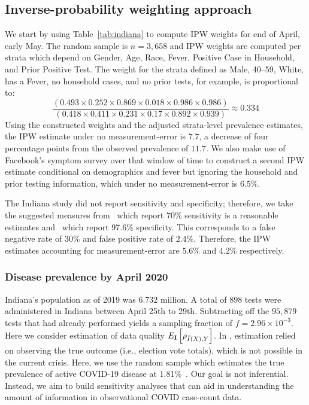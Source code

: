 \documentclass[11pt]{amsart}
\numberwithin{equation}{section}
\theoremstyle{plain}
\def\I{\bf I}
\begin{document}
\subsection{Inverse-probability weighting approach}



We start by using Table~\ref{tab:indiana} to compute IPW weights for end of April, early May.  The random sample is $n=3,658$ and IPW weights are computed per strata which depend on Gender, Age, Race, Fever, Positive Case in Household, and Prior Positive Test.  The weight for the strata defined as Male, 40--59, White, has a Fever, no household cases, and no prior tests, for example, is proportional to:
$$
\frac{\left( 0.493 \times 0.252 \times 0.869 \times 0.018 \times 0.986 \times 0.986 \right)}{\left(0.418 \times 0.411 \times 0.231 \times 0.17 \times 0.892 \times 0.939 \right)} \approx 0.334
$$
Using the constructed weights and the adjusted strata-level prevalence estimates, the IPW estimate under no measurement-error is $7.7$, a decrease of four percentage points from the observed prevalence of $11.7$. We also make use of Facebook's symptom survey over that window of time to construct a second IPW estimate conditional on demographics and fever but ignoring the household and prior testing information, which under no measurement-error is $6.5$\%.

The Indiana study did not report sensitivity and specificity; therefore, we take the suggested measures from~\cite{Woloshin2020} which report 70\% sensitivity is a reasonable estimates and~\cite{Cohen2020} which report 97.6\% specificity.  This corresponds to a false negative rate of $30\%$ and false positive rate of $2.4\%$.  Therefore, the IPW estimates accounting for measurement-error are $5.6\%$ and $4.2\%$ respectively.

\subsubsection{Disease prevalence by April 2020}

Indiana's population as of 2019 was $6.732$ million.  A total of $898$ tests were administered in Indiana between April 25th to 29th. Subtracting off the $95,879$ tests that had already performed yields a sampling fraction of $f = 2.96 \times 10^{-3}$.  Here we consider estimation of data quality $E_{\I} \left[ \rho_{\tilde I(X),Y} \right]$. In \cite{Meng2018}, estimation relied on observing the true outcome (i.e., election vote totals), which is not possible in the current crisis.  Here, we use the random sample which estimates the true prevalence of active COVID-19 disease at 1.81\%~\cite{Yiannoutsos2021}.  Our goal is not inferential. Instead, we aim to build sensitivity analyses that can aid in understanding the amount of information in observational COVID case-count data.
\end{document}
